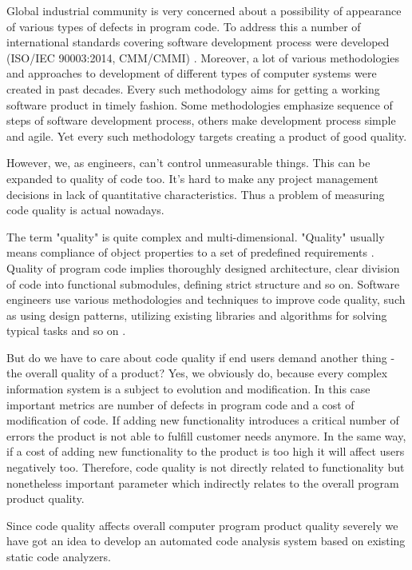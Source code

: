 \documentclass[runningheads,a4paper]{llncs}
\begin{document}
Global industrial community is very concerned about a possibility of appearance
of various types of defects in program code. To address this a number of
international standards covering software development process
were developed (ISO/IEC 90003:2014, CMM/CMMI) \cite{item02}. Moreover, a lot of
various methodologies and approaches to development of different types
of computer systems were created in past decades. Every such methodology aims
for getting a working software product in timely fashion. Some methodologies
emphasize sequence of steps of software development process, others make
development process simple and agile. Yet every such methodology targets
creating a product of good quality.

However, we, as engineers, can't control unmeasurable things. This can be
expanded to quality of code too. It's hard to make any project management
decisions in lack of quantitative characteristics. Thus a problem of measuring
code quality is actual nowadays.

The term "quality" is quite complex and multi-dimensional. "Quality" usually
means compliance of object properties to a set of predefined requirements \cite{item03}.
Quality of program code implies thoroughly designed architecture, clear division
of code into functional submodules, defining strict structure and so on.
Software engineers use various methodologies and techniques to improve code
quality, such as using design patterns, utilizing existing libraries and
algorithms for solving typical tasks and so on \cite{item04}.

But do we have to care about code quality if end users demand another
thing - the overall quality of a product? Yes, we obviously do, because every
complex information system is a subject to evolution and modification. In this
case important metrics are number of defects in program code and a cost of
modification of code. If adding new functionality introduces a critical number
of errors the product is not able to fulfill customer needs anymore. In the
same way, if a cost of adding new functionality to the product is too high
it will affect users negatively too. Therefore, code quality is not directly
related to functionality but nonetheless important parameter which indirectly
relates to the overall program product quality.

Since code quality affects overall computer program product quality severely
we have got an idea to develop an automated code analysis system based on
existing static code analyzers.
\end{document}

